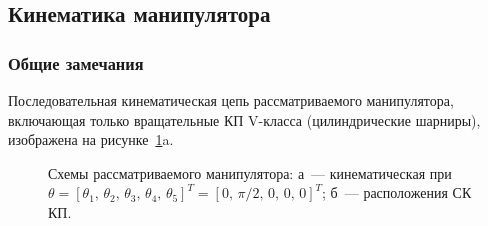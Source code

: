 \subsection{Кинематика манипулятора}\label{part_kinematics}

\subsubsection{Общие замечания}


Последовательная кинематическая цепь рассматриваемого манипулятора, включающая только вращательные КП V-класса (цилиндрические шарниры), изображена на рисунке~\ref{img:kinematics}a.

\begin{figure}[h!]
	\begin{minipage}[h]{0.5\linewidth}
	\end{minipage}
	\hfill
	\begin{minipage}[h]{0.5\linewidth}
	\end{minipage}
	\caption{Схемы рассматриваемого манипулятора: а~--- кинематическая при $\theta=\left[\theta_1,\,\theta_2,\,\theta_3,\,\theta_4,\,\theta_5\right]^T = \left[0,\,\pi/2,\,0,\,0,\,0\right]^T$; б~--- расположения СК КП.}
	\label{img:kinematics}
\end{figure}


